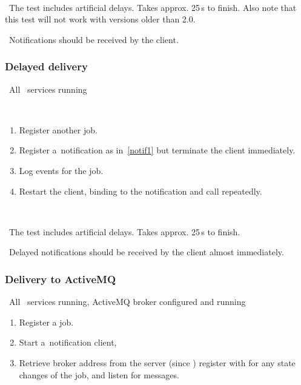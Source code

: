 \how\ 

\note\ The test includes artificial delays. Takes approx. 25\,s to finish. Also note that this test will not work with \LB versions older than 2.0.

\result\ Notifications should be received by the client.





\subsubsection{Delayed delivery}

\req\ All \LB\ services running

\what\
\begin{enumerate}
\item Register another job.
\item Register a~notification as in~\ref{notif1} but terminate the client
immediately.
\item Log events for the job.
\item Restart the client, binding to the notification and call
 repeatedly.
\end{enumerate}

\how\ 

\note\ The test includes artificial delays. Takes approx. 25\,s to finish.

\result\ Delayed notifications should be received by the client almost
immediately.


\subsubsection{Delivery to ActiveMQ}
\label{notifamq}
\req\ All \LB\ services running, ActiveMQ broker configured and running

\what
\begin{enumerate}
\item Register a job.
\item Start a~notification client,
\item Retrieve broker address from the server (since )
register with \code{edg\_wll\_NotifNew} for any state changes of the job,
and listen for messages. 
\end{enumerate}

